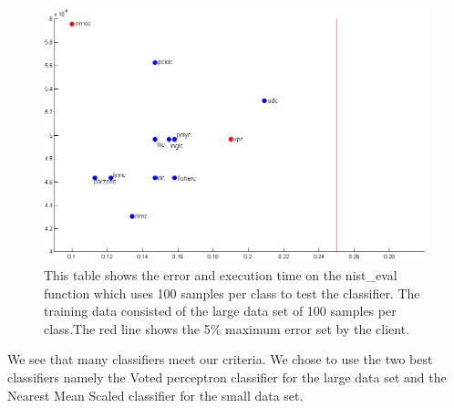\documentclass[%
        compressed,
        final,
        notitlepage,
        narroweqnarray,
        inline,
        twoside,
        ]{ieee}
\begin{document}
\begin{figure}[]
    \includegraphics[scale=0.385]{images/small_data_set_tested.png}

    \caption{
        This table shows the error and execution time on the nist\_eval
    function which uses 100 samples per class to test the classifier. The
training data consisted of the large data set of 100 samples per class.The
        red line shows the 5\% maximum error set by the client.  }
    \label{fig:test-small}
\end{figure}

We see that many classifiers meet our criteria. We chose to use the two best
classifiers namely the Voted perceptron classifier for the large data set and
the Nearest Mean Scaled classifier for the small data set.
\end{document}
